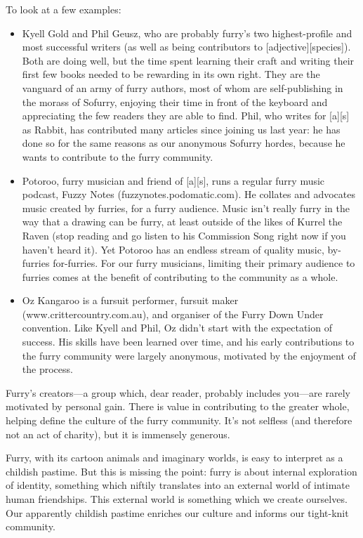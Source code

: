 To look at a few examples:

\begin{itemize}
  \item Kyell Gold and Phil Geusz, who are probably furry's two highest-profile and most successful writers (as well as being contributors to [adjective][species]). Both are doing well, but the time spent learning their craft and writing their first few books needed to be rewarding in its own right. They are the vanguard of an army of furry authors, most of whom are self-publishing in the morass of Sofurry, enjoying their time in front of the keyboard and appreciating the few readers they are able to find. Phil, who writes for [a][s] as Rabbit, has contributed many articles since joining us last year: he has done so for the same reasons as our anonymous Sofurry hordes, because he wants to contribute to the furry community.
  \item Potoroo, furry musician and friend of [a][s], runs a regular furry music podcast, Fuzzy Notes (fuzzynotes.podomatic.com). He collates and advocates music created by furries, for a furry audience. Music isn't really furry in the way that a drawing can be furry, at least outside of the likes of Kurrel the Raven (stop reading and go listen to his Commission Song right now if you haven't heard it). Yet Potoroo has an endless stream of quality music, by-furries for-furries. For our furry musicians, limiting their primary audience to furries comes at the benefit of contributing to the community as a whole.
  \item Oz Kangaroo is a fursuit performer, fursuit maker (www.crittercountry.com.au), and organiser of the Furry Down Under convention. Like Kyell and Phil, Oz didn't start with the expectation of success. His skills have been learned over time, and his early contributions to the furry community were largely anonymous, motivated by the enjoyment of the process.
\end{itemize}

Furry's creators—a group which, dear reader, probably includes you—are rarely motivated by personal gain. There is value in contributing to the greater whole, helping define the culture of the furry community. It's not selfless (and therefore not an act of charity), but it is immensely generous.

Furry, with its cartoon animals and imaginary worlds, is easy to interpret as a childish pastime. But this is missing the point: furry is about internal exploration of identity, something which niftily translates into an external world of intimate human friendships. This external world is something which we create ourselves. Our apparently childish pastime enriches our culture and informs our tight-knit community.

